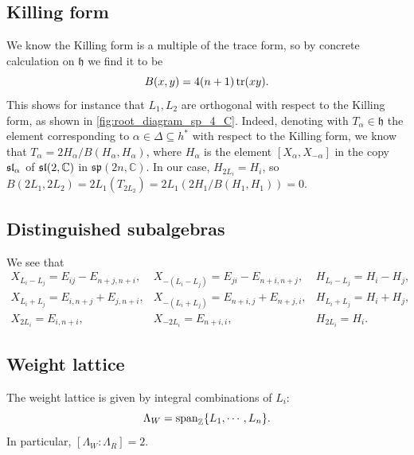\documentclass{report}
\begin{document}
\subsection{Killing form}
We know the Killing form is a multiple of the trace form, so by concrete calculation on $\mathfrak{h}$ we find it to be
\[
B(x,y) = 4(n+1)\operatorname{tr}(xy).
\]
This shows for instance that $L_1, L_2$ are orthogonal with respect to the Killing form, as shown in \cref{fig:root_diagram_sp_4_C}.
Indeed, denoting with $T_\alpha \in \mathfrak h$ the element corresponding to $\alpha \in \Delta \subseteq h^*$ with respect to the Killing form, we know that $T_\alpha = 2H_\alpha/B(H_\alpha, H_\alpha)$, where $H_\alpha$ is the element $[X_\alpha, X_{-\alpha}]$ in the copy $\operatorname{{\mathfrak{sl}}}_\alpha$ of $\operatorname{{\mathfrak{sl}}}(2, \mathbb C)$ in $\mathfrak{sp}(2n, \mathbb C)$.
In our case, $H_{2L_i} = H_i$, so $B(2L_1, 2L_2) = 2L_1(T_{2L_2}) = 2L_1(2H_1/B(H_1, H_1)) = 0$.

\subsection{Distinguished subalgebras}
We see that
\[
\begin{array}{lll}
    X_{L_i - L_j} = E_{ij} - E_{n+j,n+i}, & X_{-(L_i - L_j)} = E_{ji} - E_{n+i,n+j}, & H_{L_i - L_j} = H_i - H_j,\\
    X_{L_i + L_j} = E_{i,n+j} + E_{j,n+i}, & X_{-(L_i + L_j)} = E_{n+i,j} + E_{n+j,i}, & H_{L_i + L_j} = H_i + H_j,\\
    X_{2L_i} = E_{i,n+i}, & X_{-2L_i} = E_{n+i,i}, & H_{2L_i} = H_i.
\end{array}
\]
\subsection{Weight lattice}
The weight lattice is given by integral combinations of $L_i$:
\[
\Lambda_W = \operatorname{span}_{\mathbb Z} \{L_1, \cdots, L_n\}.
\]
In particular, $[\Lambda_W : \Lambda_R] = 2$.
\end{document}
